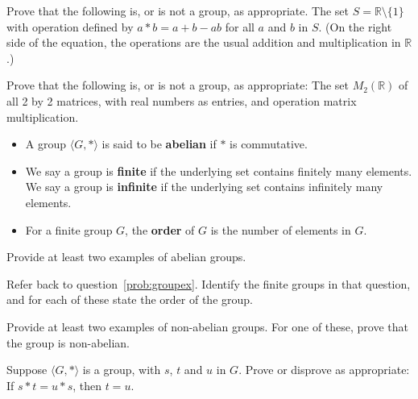 \begin{problem}
Prove that the following is, or is not a group, as appropriate.
The set \( S = \mathbb{R} \setminus \{1\} \) with operation defined by \( a * b = a + b - ab \) for all \(a\) and \(b\) in \(S\). (On the right side of the equation, the operations are the usual addition and multiplication in \(\mathbb{R} \).)
\end{problem}

\begin{problem}
Prove that the following is, or is not a group, as appropriate: The set \(M_2(\mathbb{R})\) of all 2 by 2 matrices, with real numbers as entries, and operation matrix multiplication.
\end{problem}

\begin{definition}
\begin{itemize}
  \item A group \( \langle G, * \rangle \) is said to be \textbf{abelian} if \(*\) is commutative.
  \item We say a group is \textbf{finite} if the underlying set contains finitely many elements. We say a group is \textbf{infinite} if the underlying set contains infinitely many elements.
  \item For a finite group \(G\), the \textbf{order} of \(G\) is the number of elements in \(G\).
\end{itemize}
\end{definition}

\begin{problem}
Provide at least two examples of abelian groups.
\end{problem}

\begin{problem}
Refer back to question~\ref{prob:groupex}. Identify the finite groups in that question, and for each of these state the order of the group.
\end{problem}

\begin{problem}
Provide at least two examples of non-abelian groups. For one of these, prove that the group is non-abelian.
\end{problem}

\begin{problem}
Suppose \( \langle G, * \rangle \) is a group, with \(s\), \(t\) and \(u\) in \(G\). Prove or disprove as appropriate: If \( s * t = u * s \), then \(t = u\).
\end{problem}

